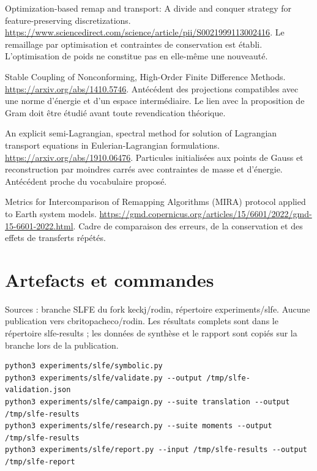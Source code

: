\documentclass[10pt,a4paper]{article}
\begin{document}
Optimization-based remap and transport: A divide and conquer strategy for feature-preserving discretizations. \url{https://www.sciencedirect.com/science/article/pii/S0021999113002416}. Le remaillage par optimisation et contraintes de conservation est établi. L'optimisation de poids ne constitue pas en elle-même une nouveauté.

Stable Coupling of Nonconforming, High-Order Finite Difference Methods. \url{https://arxiv.org/abs/1410.5746}. Antécédent des projections compatibles avec une norme d'énergie et d'un espace intermédiaire. Le lien avec la proposition de Gram doit être étudié avant toute revendication théorique.

An explicit semi-Lagrangian, spectral method for solution of Lagrangian transport equations in Eulerian-Lagrangian formulations. \url{https://arxiv.org/abs/1910.06476}. Particules initialisées aux points de Gauss et reconstruction par moindres carrés avec contraintes de masse et d'énergie. Antécédent proche du vocabulaire proposé.

Metrics for Intercomparison of Remapping Algorithms (MIRA) protocol applied to Earth system models. \url{https://gmd.copernicus.org/articles/15/6601/2022/gmd-15-6601-2022.html}. Cadre de comparaison des erreurs, de la conservation et des effets de transferts répétés.

\section{Artefacts et commandes}
Sources : branche SLFE du fork keckj/rodin, répertoire experiments/slfe. Aucune publication vers cbritopacheco/rodin. Les résultats complets sont dans le répertoire slfe-results ; les données de synthèse et le rapport sont copiés sur la branche lors de la publication.

\begin{verbatim}
python3 experiments/slfe/symbolic.py
python3 experiments/slfe/validate.py --output /tmp/slfe-validation.json
python3 experiments/slfe/campaign.py --suite translation --output /tmp/slfe-results
python3 experiments/slfe/research.py --suite moments --output /tmp/slfe-results
python3 experiments/slfe/report.py --input /tmp/slfe-results --output /tmp/slfe-report
\end{verbatim}
\end{document}
